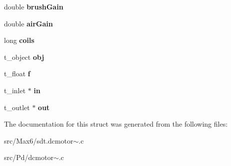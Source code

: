 \begin{DoxyCompactItemize}
\item 
\hypertarget{struct__dcmotor_ad812513fdd64170dee31144e59923c49}{}double {\bfseries brush\+Gain}\label{struct__dcmotor_ad812513fdd64170dee31144e59923c49}

\item 
\hypertarget{struct__dcmotor_aa21179d3e95b79cd04a718a9ece0b030}{}double {\bfseries air\+Gain}\label{struct__dcmotor_aa21179d3e95b79cd04a718a9ece0b030}

\item 
\hypertarget{struct__dcmotor_a672f2bc54f7098c04cdd5a159e7d7b18}{}long {\bfseries coils}\label{struct__dcmotor_a672f2bc54f7098c04cdd5a159e7d7b18}

\item 
\hypertarget{struct__dcmotor_a21775ab6bc98b0961a6e9fd9d832e65b}{}t\+\_\+object {\bfseries obj}\label{struct__dcmotor_a21775ab6bc98b0961a6e9fd9d832e65b}

\item 
\hypertarget{struct__dcmotor_a73198eb29c82f0df575e45396b68c18c}{}t\+\_\+float {\bfseries f}\label{struct__dcmotor_a73198eb29c82f0df575e45396b68c18c}

\item 
\hypertarget{struct__dcmotor_a74b02d50a0336389c4722d9aafab533b}{}t\+\_\+inlet $\ast$ {\bfseries in}\label{struct__dcmotor_a74b02d50a0336389c4722d9aafab533b}

\item 
\hypertarget{struct__dcmotor_a07b901a5d7d4140b7f701a94bf7f245c}{}t\+\_\+outlet $\ast$ {\bfseries out}\label{struct__dcmotor_a07b901a5d7d4140b7f701a94bf7f245c}

\end{DoxyCompactItemize}


The documentation for this struct was generated from the following files\+:\begin{DoxyCompactItemize}
\item 
src/\+Max6/sdt.\+dcmotor$\sim$.\+c\item 
src/\+Pd/dcmotor$\sim$.\+c\end{DoxyCompactItemize}
